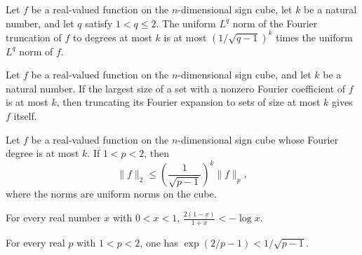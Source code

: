 \begin{theorem}
\label{FABL.degreeTruncation_norm_le_of_one_lt_le_two}
\leanok
{}
Let $f$ be a real-valued function on the $n$-dimensional sign cube, let $k$ be a natural
number, and let $q$ satisfy $1<q\le 2$. The uniform $L^q$ norm of the Fourier truncation
of $f$ to degrees at most $k$ is at most $(1/\sqrt{q-1})^k$ times the uniform $L^q$ norm
of $f$.
\end{theorem}

\begin{theorem}
\label{FABL.degreeTruncation_eq_self_of_fourierDegree_le}
\leanok
{}
Let $f$ be a real-valued function on the $n$-dimensional sign cube, and let $k$ be a
natural number. If the largest size of a set with a nonzero Fourier coefficient of $f$
is at most $k$, then truncating its Fourier expansion to sets of size at most $k$ gives
$f$ itself.
\end{theorem}

\begin{theorem}
\label{FABL.lowDegree_uniformLpNorm_two_le_weak}
\leanok
{}
Let $f$ be a real-valued function on the $n$-dimensional sign cube whose Fourier degree
is at most $k$. If $1<p<2$, then
\[\|f\|_2\le \left(\frac{1}{\sqrt{p-1}}\right)^k\|f\|_p,\]
where the norms are uniform norms on the cube.
\end{theorem}

\begin{theorem}
\label{FABL.two_mul_one_sub_div_one_add_lt_neg_log}
\leanok
{}
For every real number $x$ with $0<x<1$, $\frac{2(1-x)}{1+x}<-\log x$.
\end{theorem}

\begin{theorem}
\label{FABL.exp_two_div_sub_one_lt_inv_sqrt_sub_one}
\leanok
{}
For every real $p$ with $1<p<2$, one has $\exp(2/p-1)<1/\sqrt{p-1}$.
\end{theorem}
